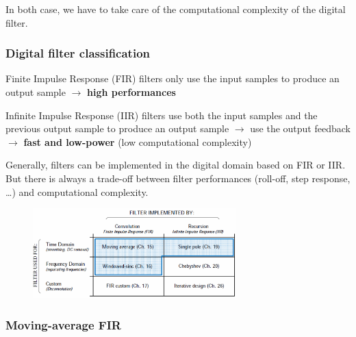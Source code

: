 \vspace{0.5cm}

In both case, we have to take care of the computational complexity of the digital filter. 

\subsubsection{Digital filter classification}

\begin{mydef}
    Finite Impulse Response (FIR) filters only use the input samples
to produce an output sample $\rightarrow$ \textbf{high performances}
\end{mydef}

\begin{mydef}
    Infinite Impulse Response (IIR) filters use both the input samples and the previous output
sample to produce an output sample $\rightarrow$ use the output feedback $\rightarrow$ \textbf{fast and low-power} (low computational complexity)
\end{mydef}
Generally, filters can be implemented in the digital domain based on FIR or IIR. But there is always a trade-off between filter performances (roll-off, step response, \dots) and computational complexity.

\begin{figure}[H]
    \centering
    \includegraphics[width = 0.7\textwidth]{L6/img/classification.PNG}
\end{figure}

\subsubsection{Moving-average FIR}

